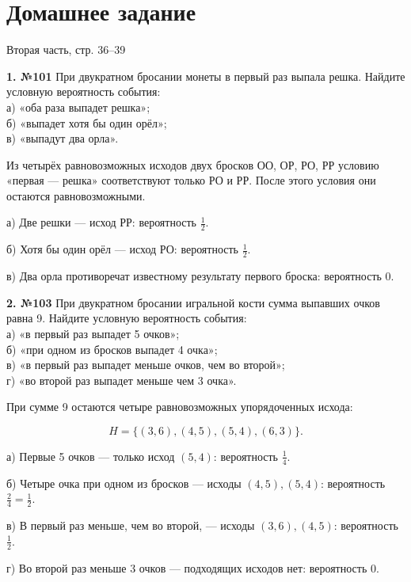 \section{Домашнее задание}

Вторая часть, стр. 36--39

\begin{task}\label{task-homework-1}
\textbf{1. №101} При двукратном бросании монеты в первый раз выпала решка. Найдите условную вероятность события:\\
 а) «оба раза выпадет решка»;\\
 б) «выпадет хотя бы один орёл»;\\
 в) «выпадут два орла».
\end{task}

\begin{solution}\label{solution-conditional-probability-homework-1}
Из четырёх равновозможных исходов двух бросков ОО, ОР, РО, РР условию «первая — решка» соответствуют только РО и РР. После этого условия они остаются равновозможными.

а) Две решки — исход РР: вероятность $\frac12$.

б) Хотя бы один орёл — исход РО: вероятность $\frac12$.

в) Два орла противоречат известному результату первого броска: вероятность 0.
\end{solution}

\begin{task}\label{task-homework-2}
\textbf{2. №103} При двукратном бросании игральной кости сумма выпавших очков равна 9. Найдите условную вероятность события:\\
 а) «в первый раз выпадет 5 очков»;\\
 б) «при одном из бросков выпадет 4 очка»;\\
 в) «в первый раз выпадет меньше очков, чем во второй»;\\
 г) «во второй раз выпадет меньше чем 3 очка».
\end{task}

\begin{solution}\label{solution-conditional-probability-homework-2}
При сумме 9 остаются четыре равновозможных упорядоченных исхода:

\[H=\{(3,6),(4,5),(5,4),(6,3)\}.\]

а) Первые 5 очков — только исход $(5,4)$: вероятность $\frac14$.

б) Четыре очка при одном из бросков — исходы $(4,5),(5,4)$: вероятность $\frac24=\frac12$.

в) В первый раз меньше, чем во второй, — исходы $(3,6),(4,5)$: вероятность $\frac12$.

г) Во второй раз меньше 3 очков — подходящих исходов нет: вероятность 0.
\end{solution}

